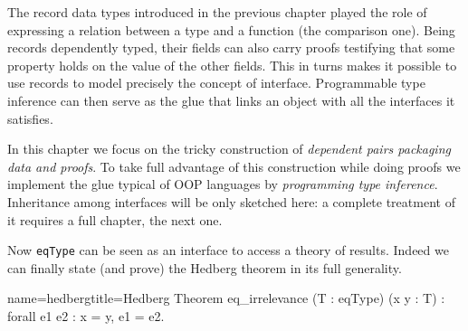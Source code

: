 The record data types introduced in the previous chapter played the
role of expressing a relation between a type and a function (the
comparison one).  Being records dependently typed, their fields can
also carry proofs testifying that some property holds on the value of
the other fields.  This in turns makes it possible to use records to
model precisely the concept of interface.  Programmable type inference
can then serve as the glue that links an object with all the
interfaces it satisfies.

In this chapter we focus on the tricky construction of
\emph{dependent pairs packaging data and proofs}.  To take
full advantage of this construction while doing proofs we
implement the glue typical of OOP languages by \emph{programming
type inference}.
Inheritance among interfaces will be only sketched here: a complete
treatment of it requires a full chapter, the next one.

Now \lstinline/eqType/ can be seen as an interface to access a
theory of results.  Indeed we can finally state (and prove) the
Hedberg theorem in its full generality.

\begin{coq}{name=hedberg}{title=Hedberg}
Theorem eq_irrelevance (T : eqType) (x y : T) : forall e1 e2 : x = y, e1 = e2.
\end{coq}


\mcbNOTES{}

